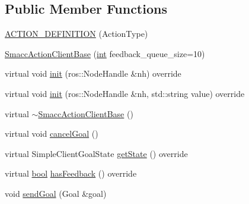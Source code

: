 \subsection*{Public Member Functions}
\begin{DoxyCompactItemize}
\item 
\hyperlink{classsmacc_1_1SmaccActionClientBase_aee053cafcc5c2e56c3c60a7de16be31a}{A\+C\+T\+I\+O\+N\+\_\+\+D\+E\+F\+I\+N\+I\+T\+I\+ON} (Action\+Type)
\item 
\hyperlink{classsmacc_1_1SmaccActionClientBase_af55217911e61d8345903f52acada3f11}{Smacc\+Action\+Client\+Base} (\hyperlink{classint}{int} feedback\+\_\+queue\+\_\+size=10)
\item 
virtual void \hyperlink{classsmacc_1_1SmaccActionClientBase_a642594be28535dd4db782b8f2777ba38}{init} (ros\+::\+Node\+Handle \&nh) override
\item 
virtual void \hyperlink{classsmacc_1_1SmaccActionClientBase_aa8288d14fe85c2c6e93e8ad635cc8ea5}{init} (ros\+::\+Node\+Handle \&nh, std\+::string value) override
\item 
virtual \hyperlink{classsmacc_1_1SmaccActionClientBase_a36e490ea3174b379fa0d809f60cf02e1}{$\sim$\+Smacc\+Action\+Client\+Base} ()
\item 
virtual void \hyperlink{classsmacc_1_1SmaccActionClientBase_ab953ee383c5dd627a62c36d06c365930}{cancel\+Goal} ()
\item 
virtual Simple\+Client\+Goal\+State \hyperlink{classsmacc_1_1SmaccActionClientBase_a7a3edf84a8126dc723f3fc5e082aecf0}{get\+State} () override
\item 
virtual \hyperlink{classbool}{bool} \hyperlink{classsmacc_1_1SmaccActionClientBase_a4746ad2b84551095274051ca58a9996d}{has\+Feedback} () override
\item 
void \hyperlink{classsmacc_1_1SmaccActionClientBase_a58c67a87c5fb8ea1633573c58fe3eee1}{send\+Goal} (Goal \&goal)
\end{DoxyCompactItemize}
